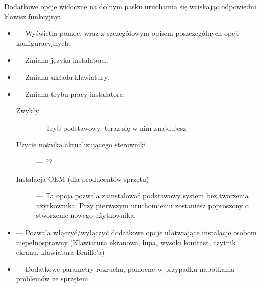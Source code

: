 Dodatkowe opcje widoczne na dolnym pasku uruchamia się wciskając odpowiedni klawisz funkcyjny:
\begin{itemize}
\item {} --- Wyświetla pomoc, wraz z szczegółowym opisem poszczególnych opcji konfiguracyjnych.
\item {} --- Zmiana języka instalatora.
\item {} --- Zmiana układu klawiatury.
\item {} --- Zmiana trybu pracy instalatora:
        \begin{description}
        \item[\textcolor{ubuntu_orange}{Zwykły}] --- Tryb podstawowy, teraz się w nim znajdujesz
        \item[\textcolor{ubuntu_orange}{Użycie nośnika aktualizującego sterowniki}] --- ?? %
        \item[\textcolor{ubuntu_orange}{Instalacja OEM (dla producentów sprzętu)}] --- Ta opcja pozwala zainstalować podstawowy system bez tworzenia użytkownika. Przy pierwszym uruchomieniu zostaniesz poproszony o stworzenie nowego użytkownika.
        \end{description}
\item {} --- Pozwala włączyć/wyłączyć dodatkowe opcje ułatwiające instalacje osobom niepełnosprawny (Klawiatura ekranowa, lupa, wysoki kontrast, czytnik ekranu, klawiatura Braille'a)
\item {} --- Dodatkowe parametry rozruchu, pomocne w przypadku napotkania problemów ze sprzętem.
\end{itemize}
\clearpage

